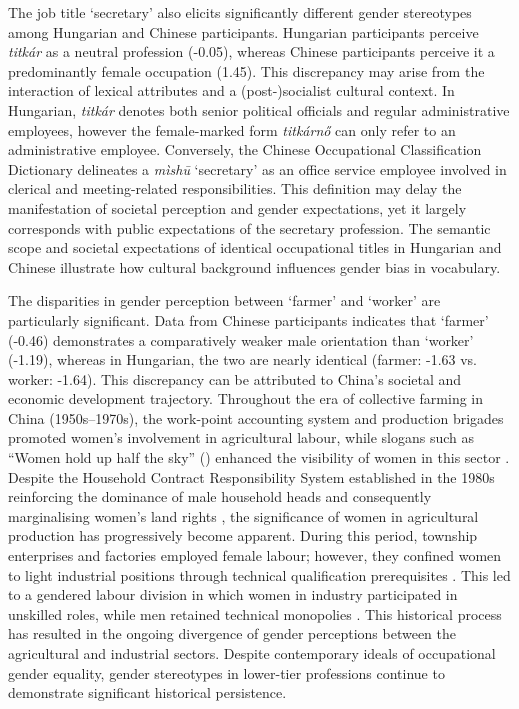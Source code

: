 \documentclass[runningheads]{llncs}
\newcommand{\zh}[1]{\simplifiedchinesefont{#1}\rmfamily}
\begin{document}
The job title `secretary' also elicits significantly different gender stereotypes among Hungarian and Chinese participants. Hungarian participants perceive \textit{titkár} as a neutral profession (-0.05), whereas Chinese participants perceive it a predominantly female occupation (1.45). This discrepancy may arise from the interaction of lexical attributes and a (post-)socialist cultural context. In Hungarian, \textit{titkár} denotes both senior political officials and regular administrative employees, however the female-marked form \textit{titkárnő} can only refer to an administrative employee. Conversely, the Chinese Occupational Classification Dictionary delineates a \zh{秘书} \textit{mìshū} `secretary' as an office service employee involved in clerical and meeting-related responsibilities. This definition may delay the manifestation of societal perception and gender expectations, yet it largely corresponds with public expectations of the secretary profession. The semantic scope and societal expectations of identical occupational titles in Hungarian and Chinese illustrate how cultural background influences gender bias in vocabulary. 


The disparities in gender perception between `farmer' and `worker' are particularly significant. Data from Chinese participants indicates that `farmer' (-0.46) demonstrates a comparatively weaker male orientation than `worker' (-1.19), whereas in Hungarian, the two are nearly identical (farmer: -1.63 vs. worker: -1.64). This discrepancy can be attributed to China’s societal and economic development trajectory. Throughout the era of collective farming in China (1950s--1970s), the work-point accounting system and production brigades promoted women's involvement in agricultural labour, while slogans such as ``Women hold up half the sky'' (\zh{妇女能顶半边天}) enhanced the visibility of women in this sector \citep{jacka_1997_agriculture,jacka_1997_domestic}. Despite the Household Contract Responsibility System established in the 1980s reinforcing the dominance of male household heads and consequently marginalising women's land rights \citep{zhu_2009_gender}, the significance of women in agricultural production has progressively become apparent. During this period, township enterprises and factories employed female labour; however, they confined women to light industrial positions through technical qualification prerequisites \citep{liu_2007_gender}. This led to a gendered labour division in which women in industry participated in unskilled roles, while men retained technical monopolies \citep{bossen_2002_chinese}. This historical process has resulted in the ongoing divergence of gender perceptions between the agricultural and industrial sectors. Despite contemporary ideals of occupational gender equality, gender stereotypes in lower-tier professions continue to demonstrate significant historical persistence.
\end{document}

